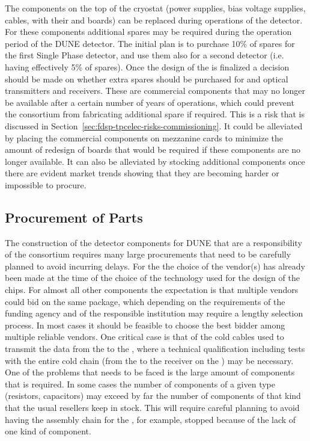 The components on the top of the cryostat (power supplies, bias
voltage supplies, cables,  with their 
and  boards) can be replaced during operations of the
detector. For these components additional spares may be required
during the \dunelifetime operation period of the DUNE detector.
The initial plan is to purchase 10\% of spares for the first
Single  Phase detector, and use them also for a second detector
(i.e. having effectively 5\% of spares). Once the design of
the  is finalized a decision should be made on whether
extra spares should be purchased for  and optical
transmitters and receivers. These are commercial components 
that may no longer be available after a certain number of 
years of operations, which could prevent the  consortium from
fabricating additional spare  if required. This
is a risk that is discussed in Section~\ref{sec:fdsp-tpcelec-risks-commissioning}.
It could be alleviated by placing the commercial components
on mezzanine cards to minimize the amount of redesign of
boards that would be required if these components are no longer available.
It can also be alleviated by stocking additional components
once there are evident market trends showing that they are 
becoming harder or impossible to procure.

\subsection{Procurement of Parts}
\label{sec:fdsp-tpcelec-production-procurement}

The construction of the detector components for DUNE that are a
responsibility of the  consortium requires many
large procurements that need to be carefully planned to avoid
incurring delays. For the  the choice of the vendor(s)
has already been made at the time of the choice of the technology
used for the design of the chips. For almost all other components
the expectation is that multiple vendors could bid on the same 
package, which depending on the requirements of the funding
agency and of the responsible institution may require a lengthy
selection process. In most cases it should be feasible to choose
the best bidder among multiple reliable vendors. One critical case
is that of the cold cables used to transmit the data from the
 to the , where a technical qualification
including tests with the entire cold chain (from the 
to the receiver on the ) may be necessary. One of the
problems that needs to be faced is the large amount of components
that is required. In some cases the number of components of a given
type (resistors, capacitors) may exceed by far the number of components
of that kind that the usual resellers keep in stock. This will 
require careful planning to avoid having the assembly chain for
the , for example, stopped because of the lack of
one kind of component.

